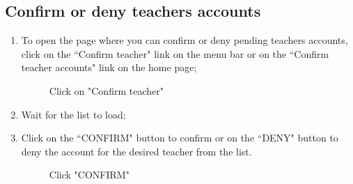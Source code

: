 \documentclass[ManualeUtente]{subfiles}
\begin{document}
	\subsection{Confirm or deny teachers accounts}
	\begin{enumerate}
		\item  To open the page where you can confirm or deny pending teachers accounts, click on the \textquotedblleft Confirm teacher" link on the menu bar or on the \textquotedblleft Confirm teacher accounts" link on the home page;
		\begin{figure}[H]
			\centering
			\caption{Click on "Confirm teacher"}
			\label{fig:Click on "Confirm teacher"}
		\end{figure}
		\item Wait for the list to load;
		\item Click on the \textquotedblleft CONFIRM" button to confirm or on the \textquotedblleft DENY" button to deny the account for the desired teacher from the list.
		\begin{figure}[H]
			\centering
			\caption{Click "CONFIRM"}
			\label{fig:Click "CONFIRM"}
		\end{figure}
	\end{enumerate}
	
\end{document}
